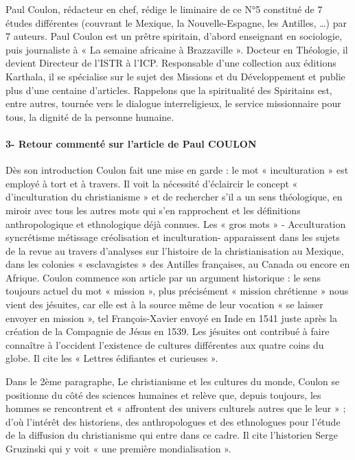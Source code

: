Paul Coulon, rédacteur en chef, rédige le liminaire de ce N°5 constitué de 7 études différentes (couvrant le Mexique, la Nouvelle-Espagne, les Antilles, …) par 7 auteurs. Paul Coulon est un prêtre spiritain, d’abord enseignant en sociologie, puis journaliste à « La semaine africaine à Brazzaville ». Docteur en Théologie, il devient Directeur de l’ISTR à l’ICP. Responsable d’une collection aux éditions Karthala, il se spécialise sur le sujet des Missions et du Développement et publie plus d’une centaine d’articles.  Rappelons que la spiritualité des Spiritains est, entre autres, tournée vers le dialogue interreligieux, le service missionnaire pour tous, la dignité de la personne humaine. 


\paragraph{3- Retour commenté sur l’article de Paul COULON }

Dès son introduction Coulon fait une mise en garde : le mot « inculturation » est employé à tort et à travers. Il voit la nécessité d’éclaircir le concept « d’inculturation du christianisme » et de rechercher s’il a un sens théologique, en miroir avec tous les autres mots qui s’en rapprochent et les définitions anthropologique et ethnologique déjà connues.  Les « gros mots » - Acculturation syncrétisme métissage créolisation et inculturation- apparaissent dans les sujets de la revue au travers d’analyses sur l’histoire de la christianisation au Mexique, dans les colonies « esclavagistes » des Antilles françaises, au Canada ou encore en Afrique. 
Coulon commence son article par un argument historique : le sens toujours actuel du mot « mission », plus précisément « mission chrétienne » nous vient des jésuites, car elle est à la source même de leur vocation « se laisser envoyer en mission », tel François-Xavier envoyé en Inde en 1541 juste après la création de la Compagnie de Jésus en 1539. Les jésuites ont contribué à faire connaître à l’occident l’existence de cultures différentes aux quatre coins du globe. Il cite les « Lettres édifiantes et curieuses ». 



Dans le 2ème paragraphe, Le christianisme et les cultures du monde, Coulon se positionne du côté des sciences humaines et relève que, depuis toujours, les hommes se rencontrent et « affrontent des univers culturels autres que le leur » ; d’où l’intérêt des historiens, des anthropologues et des ethnologues pour l’étude de la diffusion du christianisme qui entre dans ce cadre. Il cite l’historien Serge Gruzinski qui y voit « une première mondialisation ». 


